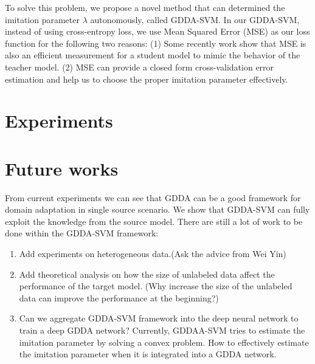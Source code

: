 \documentclass[11pt,onecolumn]{article}
\begin{document}
To solve this problem, we propose a novel method that can determined the imitation parameter $\lambda$ autonomously, called GDDA-SVM. In our GDDA-SVM, instead of using cross-entropy loss, we use Mean Squared Error (MSE) as our loss function for the following two reasons: (1) Some recently work \cite{ba2014deep} \cite{luo2016face} \cite{romero2014fitnets} \cite{urban2016deep} show that MSE is also an efficient measurement for a student model to mimic the behavior of the teacher model. (2) MSE can provide a closed form cross-validation error estimation and help us to choose the proper imitation parameter effectively. 



%


\section{Experiments}


\section{Future works}
From current experiments we can see that GDDA can be a good framework for domain adaptation in single source scenario. We show that GDDA-SVM can fully exploit the knowledge from the source model. There are still a lot of work to be done within the GDDA-SVM framework:
\begin{enumerate}
\item Add experiments on heterogeneous data.(Ask the advice from Wei Yin) 
\item Add theoretical analysis on how the size of unlabeled data affect the performance of the target model. (Why increase the size of the unlabeled data can improve the performance at the beginning?)
\item Can we aggregate GDDA-SVM framework into the deep neural network to train a deep GDDA network? Currently, GDDAA-SVM tries to estimate the imitation parameter by solving a convex problem. How to effectively estimate the imitation parameter when it is integrated into a GDDA network. 
\end{enumerate}


\end{document}
